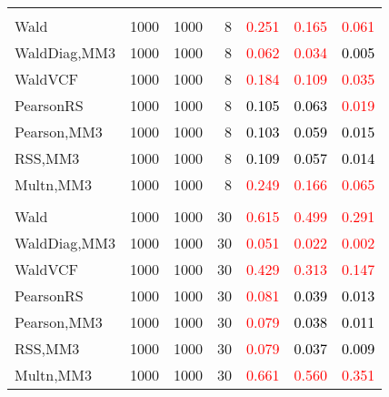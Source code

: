 \documentclass[
]{article}
\begin{document}
\begin{table}[H]
{\begin{tabular}[t]{lrrrrrr}
\addlinespace[0.3em]
\multicolumn{7}{l}{\textbf{2F 10V}}\\
\hspace{1em}Wald & 1000 & 1000 & 8 & \textcolor{red}{0.251} & \textcolor{red}{0.165} & \textcolor{red}{0.061}\\
\hspace{1em}WaldDiag,MM3 & 1000 & 1000 & 8 & \textcolor{red}{0.062} & \textcolor{red}{0.034} & \textcolor{black}{0.005}\\
\hspace{1em}WaldVCF & 1000 & 1000 & 8 & \textcolor{red}{0.184} & \textcolor{red}{0.109} & \textcolor{red}{0.035}\\
\hspace{1em}PearsonRS & 1000 & 1000 & 8 & \textcolor{black}{0.105} & \textcolor{black}{0.063} & \textcolor{red}{0.019}\\
\hspace{1em}Pearson,MM3 & 1000 & 1000 & 8 & \textcolor{black}{0.103} & \textcolor{black}{0.059} & \textcolor{black}{0.015}\\
\hspace{1em}RSS,MM3 & 1000 & 1000 & 8 & \textcolor{black}{0.109} & \textcolor{black}{0.057} & \textcolor{black}{0.014}\\
\hspace{1em}Multn,MM3 & 1000 & 1000 & 8 & \textcolor{red}{0.249} & \textcolor{red}{0.166} & \textcolor{red}{0.065}\\
\addlinespace[0.3em]
\multicolumn{7}{l}{\textbf{3F 15V}}\\
\hspace{1em}Wald & 1000 & 1000 & 30 & \textcolor{red}{0.615} & \textcolor{red}{0.499} & \textcolor{red}{0.291}\\
\hspace{1em}WaldDiag,MM3 & 1000 & 1000 & 30 & \textcolor{red}{0.051} & \textcolor{red}{0.022} & \textcolor{red}{0.002}\\
\hspace{1em}WaldVCF & 1000 & 1000 & 30 & \textcolor{red}{0.429} & \textcolor{red}{0.313} & \textcolor{red}{0.147}\\
\hspace{1em}PearsonRS & 1000 & 1000 & 30 & \textcolor{red}{0.081} & \textcolor{black}{0.039} & \textcolor{black}{0.013}\\
\hspace{1em}Pearson,MM3 & 1000 & 1000 & 30 & \textcolor{red}{0.079} & \textcolor{black}{0.038} & \textcolor{black}{0.011}\\
\hspace{1em}RSS,MM3 & 1000 & 1000 & 30 & \textcolor{red}{0.079} & \textcolor{black}{0.037} & \textcolor{black}{0.009}\\
\hspace{1em}Multn,MM3 & 1000 & 1000 & 30 & \textcolor{red}{0.661} & \textcolor{red}{0.560} & \textcolor{red}{0.351}\\
\bottomrule
\end{tabular}}
\endgroup{}
\end{table}
\end{document}
